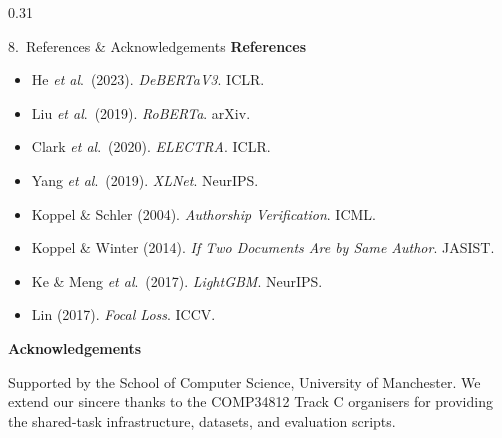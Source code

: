 \documentclass[final,t]{beamer}
\newcommand{\etal}{\textit{et al}.}
\begin{document}
\begin{frame}[t]
\begin{columns}[T,totalwidth=\linewidth]
\begin{column}{0.31\linewidth}
\begin{exampleblock}{8.\ References \& Acknowledgements}
      \vspace{0.6ex}
      \normalsize
      \textbf{References}
      \vspace{0.4ex}
      
      \normalsize
      \begin{itemize}\itemsep4pt
        \item[{[1]}] He \etal\ (2023). \textit{DeBERTaV3}. ICLR.
        \item[{[2]}] Liu \etal\ (2019). \textit{RoBERTa}. arXiv.
        \item[{[3]}] Clark \etal\ (2020). \textit{ELECTRA}. ICLR.
        \item[{[4]}] Yang \etal\ (2019). \textit{XLNet}. NeurIPS.
        \item[{[5]}] Koppel \& Schler (2004). \textit{Authorship Verification}. ICML.
        \item[{[6]}] Koppel \& Winter (2014). \textit{If Two Documents Are by Same Author}. JASIST.
        \item[{[7]}] Ke \& Meng \etal\ (2017). \textit{LightGBM}. NeurIPS.
        \item[{[8]}] Lin (2017). \textit{Focal Loss}. ICCV.
      \end{itemize}

      \vspace{0.5ex}
      \normalsize
      \textbf{Acknowledgements}\par
      \vspace*{0.2ex}
      \small
      Supported by the School of Computer Science, University of
      Manchester.  We extend our sincere thanks to the COMP34812 Track C
      organisers for providing the shared-task infrastructure, datasets,
      and evaluation scripts.

      \par\rule{0pt}{0.1cm}
    \end{exampleblock}
  \end{column}

\end{columns}

\end{frame}
\end{document}
